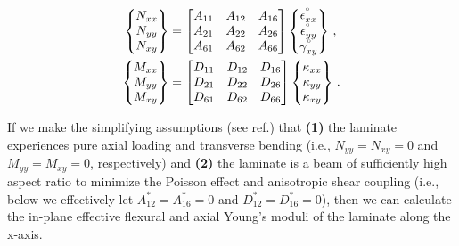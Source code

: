 \documentclass[twocolumn, linenumbers, superscriptaddress]{revtex4-1}
\begin{document}
				\begin{equation}
					\begin{aligned}
						\begin{Bmatrix}
							N_{xx} \\
							N_{yy} \\
							N_{xy}
						\end{Bmatrix}
						& =
						\begin{bmatrix}
							A_{11} & A_{12} & A_{16} \\
							A_{21} & A_{22} & A_{26} \\
							A_{61} & A_{62} & A_{66}
						\end{bmatrix}
						\begin{Bmatrix}
							\epsilon^{\degree}_{xx} \\
							\epsilon^{\degree}_{yy} \\
							\gamma^{\degree}_{xy}
						\end{Bmatrix}\,,
						\\
						\begin{Bmatrix}
							M_{xx} \\
							M_{yy} \\
							M_{xy}
						\end{Bmatrix}
						& =
						\begin{bmatrix}
							D_{11} & D_{12} & D_{16} \\
							D_{21} & D_{22} & D_{26} \\
							D_{61} & D_{62} & D_{66}
						\end{bmatrix}
						\begin{Bmatrix}
							\kappa_{xx} \\
							\kappa_{yy} \\
							\kappa_{xy}
						\end{Bmatrix}\,.
					\end{aligned}
				\end{equation}
				
				If we make the simplifying assumptions (see ref.) that \textbf{(1)} the laminate experiences pure axial loading and transverse bending (i.e., $N_{yy} = N_{xy} = 0$ and $M_{yy} = M_{xy} = 0$, respectively) and \textbf{(2)} the laminate is a beam of sufficiently high aspect ratio to minimize the Poisson effect and anisotropic shear coupling (i.e., below we effectively let $A^*_{12} = A^*_{16} = 0$ and $D^*_{12} = D^*_{16} = 0$), then we can calculate the in-plane effective flexural and axial Young's moduli of the laminate along the x-axis.
				
\end{document}
